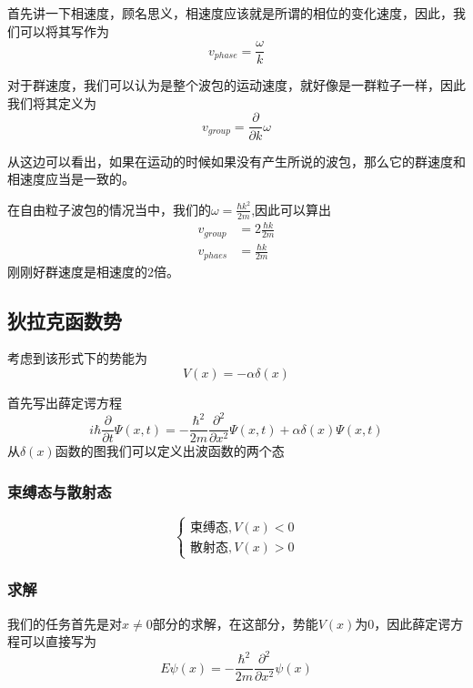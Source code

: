 \documentclass{article}
\newcommand{\Da}[2]{\frac{\partial}{\partial#2}#1}
\begin{document}
首先讲一下相速度，顾名思义，相速度应该就是所谓的相位的变化速度，因此，我们可以将其写作为
\[
    v_{phase}=\frac{\omega}{k}
\]

对于群速度，我们可以认为是整个波包的运动速度，就好像是一群粒子一样，因此我们将其定义为
\[
    v_{group}=\Da{\omega}{k}
\]

从这边可以看出，如果在运动的时候如果没有产生所说的波包，那么它的群速度和相速度应当是一致的。

在自由粒子波包的情况当中，我们的$\omega = \frac{\hbar k^2}{2m}$,因此可以算出
\begin{align*}
    v_{group}&=2\frac{\hbar k}{2m}\\
    v_{phaes}&=\frac{\hbar k}{2m}
\end{align*}
刚刚好群速度是相速度的$2$倍。

\subsection{狄拉克函数势}

考虑到该形式下的势能为
\[V(x)=-\alpha\delta(x)\]

\begin{figure}[hbtp]
    \centering
\end{figure}

首先写出薛定谔方程 
\[
    i\hbar\frac{\partial}{\partial t}\Psi(x,t)=-\frac{\hbar^2}{2m}\frac{\partial^2}{\partial x^2}\Psi(x,t)+\alpha\delta(x)\Psi(x,t)
\]
从$\delta(x)$函数的图我们可以定义出波函数的两个态
\subsubsection{束缚态与散射态}
\[
\begin{cases}
    \text{束缚态},V(x)<0\\
    \text{散射态},V(x)>0    
\end{cases}
\]
\subsubsection{求解}

我们的任务首先是对$x\neq 0$部分的求解，在这部分，势能$V(x)$为$0$，因此薛定谔方程可以直接写为
\[
    E\psi(x)=-\frac{\hbar^2}{2m}\frac{\partial^2}{\partial x^2}\psi(x)
\]
\end{document}
